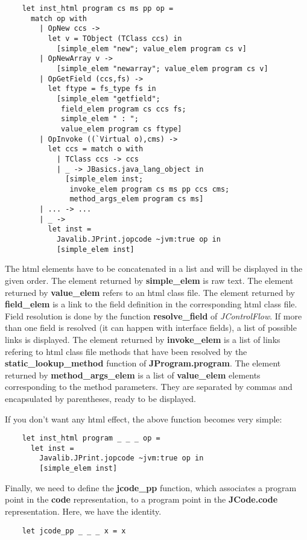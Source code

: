 \documentclass{article}
\begin{document}
\begin{verbatim}
    let inst_html program cs ms pp op =
      match op with
        | OpNew ccs ->
          let v = TObject (TClass ccs) in
            [simple_elem "new"; value_elem program cs v]
        | OpNewArray v ->
            [simple_elem "newarray"; value_elem program cs v]
        | OpGetField (ccs,fs) ->
          let ftype = fs_type fs in
            [simple_elem "getfield";
             field_elem program cs ccs fs;
             simple_elem " : ";
             value_elem program cs ftype]
        | OpInvoke ((`Virtual o),cms) ->
          let ccs = match o with
            | TClass ccs -> ccs
            | _ -> JBasics.java_lang_object in
              [simple_elem inst;
               invoke_elem program cs ms pp ccs cms;
               method_args_elem program cs ms]
        | ... -> ...
        | _ ->
          let inst =
            Javalib.JPrint.jopcode ~jvm:true op in
            [simple_elem inst]
\end{verbatim}
The html elements have to be concatenated in a list and will be
displayed in the given order. The element returned by
\textbf{simple\_elem} is raw text. The element returned by
\textbf{value\_elem} refers to an html class file. The element
returned by \textbf{field\_elem} is a link to the field definition
in the corresponding html class file. Field resolution is done by
the function \textbf{resolve\_field} of \emph{JControlFlow}. If
more than one field is resolved (it can happen with interface
fields), a list of possible links is displayed. The element
returned by \textbf{invoke\_elem} is a list of links refering to
html class file methods that have been resolved by the
\textbf{static\_lookup\_method} function of
\textbf{JProgram.program}. The element returned by
\textbf{method\_args\_elem} is a list of \textbf{value\_elem}
elements corresponding to the method parameters. They are separated
by commas and encapsulated by parentheses, ready to be displayed.

If you don't want any html effect, the above function becomes very
simple:

\begin{verbatim}
    let inst_html program _ _ _ op =
      let inst =
        Javalib.JPrint.jopcode ~jvm:true op in
        [simple_elem inst]
\end{verbatim}
Finally, we need to define the \textbf{jcode\_pp} function, which
associates a program point in the \textbf{code} representation, to
a program point in the \textbf{JCode.code} representation. Here, we
have the identity.

\begin{verbatim}
    let jcode_pp _ _ _ x = x
\end{verbatim}
\end{document}
